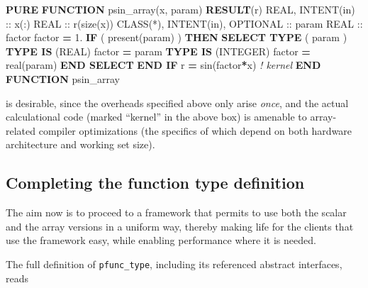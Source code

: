 \documentclass[
]{article}
\newenvironment{Shaded}{}{}
\newcommand{\BuiltInTok}[1]{\textcolor[rgb]{0.00,0.50,0.00}{#1}}
\newcommand{\CommentTok}[1]{\textcolor[rgb]{0.38,0.63,0.69}{\textit{#1}}}
\newcommand{\DataTypeTok}[1]{\textcolor[rgb]{0.56,0.13,0.00}{#1}}
\newcommand{\FloatTok}[1]{\textcolor[rgb]{0.25,0.63,0.44}{#1}}
\newcommand{\FunctionTok}[1]{\textcolor[rgb]{0.02,0.16,0.49}{#1}}
\newcommand{\KeywordTok}[1]{\textcolor[rgb]{0.00,0.44,0.13}{\textbf{#1}}}
\newcommand{\NormalTok}[1]{#1}
\begin{document}
\begin{Shaded}
\begin{Highlighting}[]
\KeywordTok{PURE} \KeywordTok{FUNCTION}\NormalTok{ psin\_array(x, param) }\KeywordTok{RESULT}\NormalTok{(r)}
   \DataTypeTok{REAL}\NormalTok{, }\DataTypeTok{INTENT(in)} \DataTypeTok{::}\NormalTok{ x(:)}
   \DataTypeTok{REAL} \DataTypeTok{::}\NormalTok{ r(}\FunctionTok{size}\NormalTok{(x))}
   \DataTypeTok{CLASS(*)}\NormalTok{, }\DataTypeTok{INTENT(in)}\NormalTok{, }\DataTypeTok{OPTIONAL} \DataTypeTok{::}\NormalTok{ param}
   \DataTypeTok{REAL} \DataTypeTok{::}\NormalTok{ factor}
\NormalTok{   factor }\KeywordTok{=} \FloatTok{1.}
   \KeywordTok{IF}\NormalTok{ ( }\FunctionTok{present}\NormalTok{(param) ) }\KeywordTok{THEN}
      \KeywordTok{SELECT TYPE}\NormalTok{ ( param )}
      \KeywordTok{TYPE IS}\NormalTok{ (}\DataTypeTok{REAL}\NormalTok{)}
\NormalTok{         factor }\KeywordTok{=}\NormalTok{ param}
      \KeywordTok{TYPE IS}\NormalTok{ (}\DataTypeTok{INTEGER}\NormalTok{)}
\NormalTok{         factor }\KeywordTok{=} \DataTypeTok{real(param)}
      \KeywordTok{END SELECT}
   \KeywordTok{END IF}
\NormalTok{   r }\KeywordTok{=} \BuiltInTok{sin}\NormalTok{(factor}\KeywordTok{*}\NormalTok{x)  }\CommentTok{! kernel}
\KeywordTok{END FUNCTION}\NormalTok{ psin\_array}
\end{Highlighting}
\end{Shaded}

is desirable, since the overheads specified above only arise
\emph{once}, and the actual calculational code (marked ``kernel'' in the
above box) is amenable to array-related compiler optimizations (the
specifics of which depend on both hardware architecture and working set
size).

\subsection{Completing the function type
definition}\label{completing-the-function-type-definition}

The aim now is to proceed to a framework that permits to use both the
scalar and the array versions in a uniform way, thereby making life for
the clients that use the framework easy, while enabling performance
where it is needed.

The full definition of \texttt{pfunc\_type}, including its referenced
abstract interfaces, reads
\end{document}
